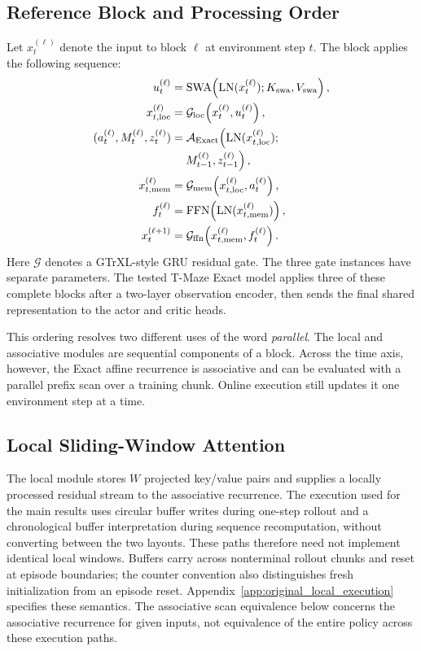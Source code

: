\subsection{Reference Block and Processing Order}
Let $x_t^{(\ell)}$ denote the input to block $\ell$ at environment step $t$.
The block applies the following sequence:
\begin{align}
u_t^{(\ell)}
  &= \operatorname{SWA}\!\left(\operatorname{LN}(x_t^{(\ell)});
      K_{\mathrm{swa}},V_{\mathrm{swa}}\right),\\
x_{t,\mathrm{loc}}^{(\ell)}
  &= \mathcal{G}_{\mathrm{loc}}\!\left(x_t^{(\ell)},u_t^{(\ell)}\right),\\
(a_t^{(\ell)},M_t^{(\ell)},z_t^{(\ell)})
  &= \mathcal{A}_{\mathrm{Exact}}\!\left(\operatorname{LN}(x_{t,\mathrm{loc}}^{(\ell)});\right.\notag\\[-2pt]
  &\quad\left.M_{t-1}^{(\ell)},z_{t-1}^{(\ell)}\right),\\
x_{t,\mathrm{mem}}^{(\ell)}
  &= \mathcal{G}_{\mathrm{mem}}\!\left(x_{t,\mathrm{loc}}^{(\ell)},a_t^{(\ell)}\right),\\
f_t^{(\ell)}
  &= \operatorname{FFN}\!\left(\operatorname{LN}(x_{t,\mathrm{mem}}^{(\ell)})\right),\\
x_t^{(\ell+1)}
  &= \mathcal{G}_{\mathrm{ffn}}\!\left(x_{t,\mathrm{mem}}^{(\ell)},f_t^{(\ell)}\right).
\label{eq:exact_block_order}
\end{align}
Here $\mathcal{G}$ denotes a GTrXL-style GRU residual gate. The three gate
instances have separate parameters. The tested T-Maze Exact model applies three
of these complete blocks after a two-layer observation encoder, then sends the
final shared representation to the actor and critic heads.

This ordering resolves two different uses of the word \emph{parallel}. The
local and associative modules are sequential components of a block. Across the
time axis, however, the Exact affine recurrence is associative and can be
evaluated with a parallel prefix scan over a training chunk. Online execution
still updates it one environment step at a time.

\subsection{Local Sliding-Window Attention}
The local module stores $W$ projected key/value pairs and supplies a locally
processed residual stream to the associative recurrence. The execution used for the main results
uses circular buffer writes during one-step rollout and a chronological buffer
interpretation during sequence recomputation, without converting between the
two layouts. These paths therefore need not implement identical local windows.
Buffers carry across nonterminal rollout chunks and reset at episode boundaries;
the counter convention also distinguishes fresh initialization from an episode
reset. Appendix~\ref{app:original_local_execution} specifies these semantics.
The associative scan equivalence below concerns the associative recurrence for
given inputs, not equivalence of the entire policy across these execution paths.

